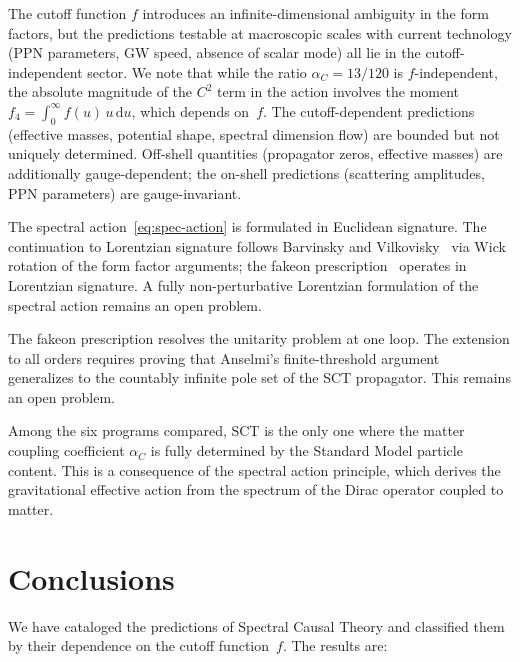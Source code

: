 \documentclass[12pt,a4paper]{article}
\theoremstyle{plain}
\theoremstyle{definition}
\theoremstyle{remark}
\newcommand{\dd}{\mathrm{d}}
\begin{document}
The cutoff function $f$ introduces an infinite-dimensional
ambiguity in the form factors, but the predictions testable at
macroscopic scales with current technology (PPN parameters, GW
speed, absence of scalar mode) all lie in the cutoff-independent
sector.  We note that while the ratio $\alpha_C = 13/120$ is
$f$-independent, the absolute magnitude of the $C^2$ term
in the action involves the moment $f_4 = \int_0^\infty
f(u)\, u\, \dd u$, which depends on~$f$.  The
cutoff-dependent predictions (effective masses, potential shape,
spectral dimension flow) are bounded but not uniquely
determined.  Off-shell quantities (propagator zeros, effective
masses) are additionally gauge-dependent; the on-shell
predictions (scattering amplitudes, PPN parameters) are
gauge-invariant.

The spectral action~\eqref{eq:spec-action} is formulated in
Euclidean signature.  The continuation to Lorentzian signature
follows Barvinsky and Vilkovisky~\cite{BV:1990} via Wick
rotation of the form factor arguments; the fakeon
prescription~\cite{Anselmi:2017} operates in Lorentzian
signature.  A fully non-perturbative Lorentzian formulation of
the spectral action remains an open problem.

The fakeon prescription resolves the unitarity problem at one
loop.  The extension to all orders requires proving that
Anselmi's finite-threshold argument~\cite{Anselmi:2018}
generalizes to the countably infinite pole set of the SCT
propagator.  This remains an open problem.

Among the six programs compared, SCT is the only one where the
matter coupling coefficient $\alpha_C$ is fully determined by
the Standard Model particle content.  This is a consequence of
the spectral action principle, which derives the gravitational
effective action from the spectrum of the Dirac operator coupled
to matter.

\section{Conclusions}
\label{sec:conclusions}

We have cataloged the predictions of Spectral Causal Theory and
classified them by their dependence on the cutoff function~$f$.
The results are:
\end{document}
